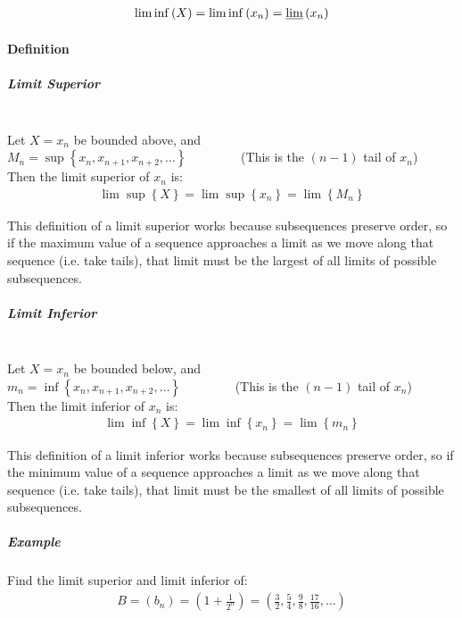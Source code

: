\documentclass[class=article, crop=false]{standalone}
\begin{document}
\begin{align}
  \liminf \left( X \right) = \liminf \left( x_n \right) = \varliminf \left( x_n \right) %
  \label{liminfnotdef}
\end{align}

\paragraph{Definition}
\subparagraph{Limit Superior} \ \\
Let $X = x_{n}$ be bounded above, and  \\
$M_n = \sup \left\{ x_n, x_{n+1}, x_{n+2}, \dots \right\} \qquad \qquad$ (This is the $\left( n-1 \right)$ tail of $x_n$) \\
Then the limit superior of $x_n$ is:
\begin{align}
  \lim \sup \left\{ X \right\} = \lim \sup \left\{ x_n \right\} = \lim \left\{ M_n \right\}
  \label{limsupdef}
\end{align}

This definition of a limit superior works because subsequences preserve order, so if the maximum value of a sequence approaches a limit as we move along that sequence (i.e. take tails), that limit must be the largest of all limits of possible subsequences.

\subparagraph{Limit Inferior} \ \\
Let $X = x_{n}$ be bounded below, and  \\
$m_n = \inf \left\{ x_n, x_{n+1}, x_{n+2}, \dots \right\} \qquad \qquad$ (This is the $\left( n-1 \right)$ tail of $x_n$) \\
Then the limit inferior of $x_n$ is:
\begin{align}
  \lim \inf \left\{ X \right\} = \lim \inf \left\{ x_n \right\} = \lim \left\{ m_n \right\}
  \label{liminfdef}
\end{align}

This definition of a limit inferior works because subsequences preserve order, so if the minimum value of a sequence approaches a limit as we move along that sequence (i.e. take tails), that limit must be the smallest of all limits of possible subsequences.


\subparagraph{Example} 
Find the limit superior and limit inferior  of:
\begin{align}
  B = \left( b_n \right) = \left( 1+\frac{1}{2^n} \right) = \left( \frac{3}{2}, \frac{5}{4}, \frac{9}{8}, \frac{17}{16}, \dots \right)
  \label{eglimb}
\end{align}
\end{document}
